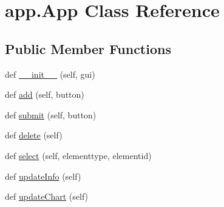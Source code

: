 \hypertarget{classapp_1_1_app}{}\section{app.\+App Class Reference}
\label{classapp_1_1_app}
\subsection*{Public Member Functions}
\begin{DoxyCompactItemize}
\item 
def \hyperlink{classapp_1_1_app_a7ebfdd74ff42ca9b5c1dd6383b4641f8}{\+\_\+\+\_\+init\+\_\+\+\_\+} (self, gui)
\item 
def \hyperlink{classapp_1_1_app_a12410afa08ea83e0e75958316f3bfa44}{add} (self, button)
\item 
def \hyperlink{classapp_1_1_app_a5fa0636a03dcc38bf7bcf219d27167ca}{submit} (self, button)
\item 
def \hyperlink{classapp_1_1_app_a11694b61d1b324b5628ca9b110990451}{delete} (self)
\item 
def \hyperlink{classapp_1_1_app_a36fc2b881076006c2f949cbd524638e8}{select} (self, elementtype, elementid)
\item 
def \hyperlink{classapp_1_1_app_aa62a8da887512bee037e88bb0dab9b4f}{update\+Info} (self)
\item 
def \hyperlink{classapp_1_1_app_a8f0a02d26fd64277f30a700190bdc9f2}{update\+Chart} (self)
\end{DoxyCompactItemize}
